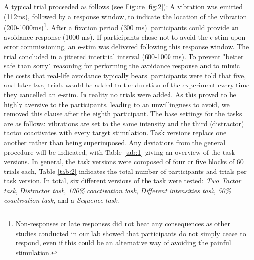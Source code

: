 \documentclass[twocolumn, serif, authordate, empirical]{jote-article}
\begin{document}
A typical trial proceeded as follows (see Figure \ref{fig:2}): A vibration was emitted (112ms), followed by a response window, to indicate the location of the vibration (200-1000ms)\footnote{Non-responses or late responses did not bear any consequences as other studies conducted in our lab showed that participants do not simply cease to respond, even if this could be an alternative way of avoiding the painful stimulation.
}. After a fixation period (300 ms), participants could provide an avoidance response (1000 ms). If participants chose not to avoid the e-stim upon error commissioning, an e-stim was delivered following this response window. The trial concluded in a jittered intertrial interval (600-1000 ms). To prevent "better safe than sorry" reasoning for performing the avoidance response and to mimic the costs that real-life avoidance typically bears, participants were told that five, and later two, trials would be added to the duration of the experiment every time they cancelled an e-stim. In reality no trials were added. As this proved to be highly aversive to the participants, leading to an unwillingness to avoid, we removed this clause after the eighth participant. The base settings for the tasks are as follows: vibrations are set to the same intensity and the third (distractor) tactor coactivates with every target stimulation. Task versions replace one another rather than being superimposed. Any deviations from the general procedure will be indicated, with Table \ref{tab:1} giving an overview of the task versions. In general, the task versions were composed of four or five blocks of 60 trials each, Table \ref{tab:2} indicates the total number of participants and trials per task version. In total, six different versions of the task were tested: \emph{Two Tactor task}, \emph{Distractor task}, \emph{100\% coactivation task}, \emph{Different intensities task}, \emph{50\% coactivation task}, and a \emph{Sequence task}.
\end{document}
